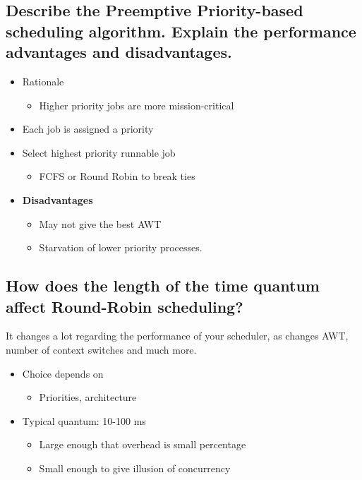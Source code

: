 \documentclass[a4paper]{article}
\begin{document}
\subsection{Describe the Preemptive Priority-based scheduling algorithm. Explain the performance advantages and disadvantages.} %
\label{sub:Describe the Preemptive Priority-based scheduling algorithm. Explain the performance advantages and disadvantages.}
\begin{itemize}
  \item Rationale
    \begin{itemize}
      \item Higher priority jobs are more mission-critical
    \end{itemize}
  \item Each job is assigned a priority
  \item Select highest priority runnable job
    \begin{itemize}
      \item FCFS or Round Robin to break ties
    \end{itemize}
  \item {\bf Disadvantages}
    \begin{itemize}
      \item May not give the best AWT
      \item Starvation of lower priority processes.
    \end{itemize}
\end{itemize}
\subsection{How does the length of the time quantum affect Round-Robin scheduling?} %
\label{sub:How does the length of the time quantum affect Round-Robin scheduling?}
It changes a lot regarding the performance of your scheduler, as changes AWT, number of context switches and much more.
\begin{itemize}
  \item Choice depends on
    \begin{itemize}
      \item Priorities, architecture
    \end{itemize}
  \item Typical quantum: 10-100 ms
    \begin{itemize}
      \item Large enough that overhead is small percentage
      \item Small enough to give illusion of concurrency
    \end{itemize}
\end{itemize}
\end{document}
